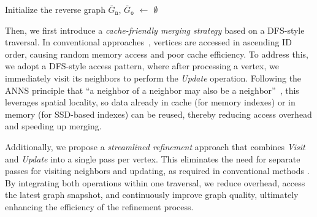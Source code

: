\documentclass[acmsmall]{acmart}
\theoremstyle{remark}
\theoremstyle{definition}
\begin{document}
\begin{algorithm}[t]\small
	\DontPrintSemicolon
	
	Initialize the reverse graph $\overline{G}_{\texttt{n}}$, $\overline{G}_{\texttt{o}}$ $\gets$ $\emptyset$\;
	
	\;
	
	\caption{$k$-NNG Refinement}
	\label{alg:refine}
\end{algorithm}

Then, we first introduce a \textit{cache-friendly merging strategy} based on a DFS-style traversal. In conventional approaches~\cite{dong2011efficient}, vertices are accessed in ascending ID order, causing random memory access and poor cache efficiency. To address this, we adopt a DFS-style access pattern, where after processing a vertex, we immediately visit its neighbors to perform the \textit{Update} operation. Following the ANNS principle that “a neighbor of a neighbor may also be a neighbor”~\cite{wang2021comprehensive}, this leverages spatial locality, so data already in cache (for memory indexes) or in memory (for SSD-based indexes) can be reused, thereby reducing access overhead and speeding up merging.\label{rev:cachefriendly}

Additionally, we propose a \textit{streamlined refinement} approach that combines \textit{Visit} and \textit{Update} into a single pass per vertex. This eliminates the need for separate passes for visiting neighbors and updating, as required in conventional methods \cite{dong2011efficient}. By integrating both operations within one traversal, we reduce overhead, access the latest graph snapshot, and continuously improve graph quality, ultimately enhancing the efficiency of the refinement process.
\end{document}
